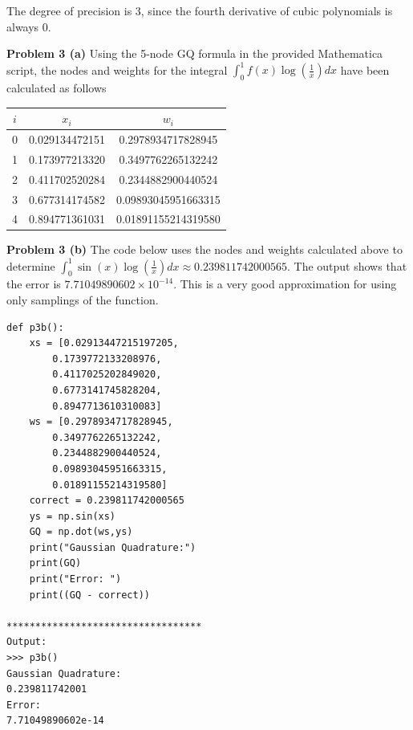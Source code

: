 \documentclass[12pt]{article}
\newcommand{\problem}[1]{\hspace{-4 ex} \large \textbf{Problem #1} }
\begin{document}
	The degree of precision is 3, since the fourth derivative of cubic polynomials is always 0.
	
	
\bigbreak
\problem{3 (a)} Using the 5-node GQ formula in the provided Mathematica script, the nodes and weights for the integral $\int_0^1 f(x)\log(\tfrac{1}{x})dx$ have been calculated as follows\\
\begin{center}
	\begin{tabular}{|c|c|c|}\hline
		$i$ & $x_i$ & $w_i$\\ \hline
		0 & 0.029134472151 & 0.2978934717828945 \\ \hline
		1 & 0.173977213320 & 0.3497762265132242 \\ \hline
		2 & 0.411702520284 & 0.2344882900440524 \\ \hline
		3 & 0.677314174582 & 0.09893045951663315 \\ \hline
		4 & 0.894771361031 & 0.01891155214319580 \\ \hline
	\end{tabular}
\end{center}

\bigbreak
\problem{3 (b)} The code below uses the nodes and weights calculated above to determine $\int_0^1 \sin(x)\log(\tfrac{1}{x})dx \approx 0.239811742000565$. The output shows that the error is $7.71049890602\times 10^{-14}$. This is a very good approximation for using only samplings of the function.

\begin{lstlisting}
def p3b():
	xs = [0.02913447215197205,
		0.1739772133208976,
		0.4117025202849020,
		0.6773141745828204,
		0.8947713610310083]
	ws = [0.2978934717828945,
		0.3497762265132242,
		0.2344882900440524,
		0.09893045951663315,
		0.01891155214319580]
	correct = 0.239811742000565
	ys = np.sin(xs)
	GQ = np.dot(ws,ys)
	print("Gaussian Quadrature:")
	print(GQ)
	print("Error: ")
	print((GQ - correct))

**********************************
Output:
>>> p3b()
Gaussian Quadrature:
0.239811742001
Error: 
7.71049890602e-14
\end{lstlisting}
\end{document}
